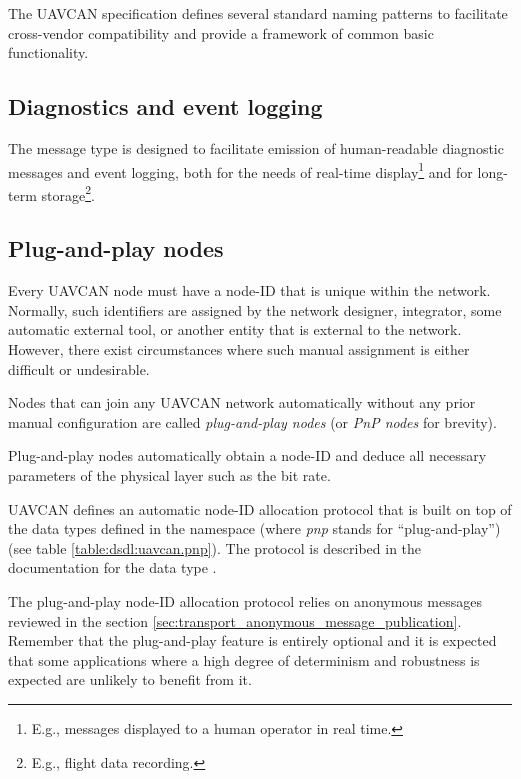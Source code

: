 The UAVCAN specification defines several standard naming patterns to facilitate cross-vendor compatibility
and provide a framework of common basic functionality.


\subsection{Diagnostics and event logging}

The message type  is designed to facilitate emission of
human-readable diagnostic messages and event logging,
both for the needs of real-time display\footnote{E.g., messages displayed to a human operator in real time.}
and for long-term storage\footnote{E.g., flight data recording.}.

\subsection{Plug-and-play nodes}

Every UAVCAN node must have a node-ID that is unique within the network.
Normally, such identifiers are assigned by the network designer, integrator, some automatic external tool,
or another entity that is external to the network.
However, there exist circumstances where such manual assignment is either difficult or undesirable.

Nodes that can join any UAVCAN network automatically without any prior manual configuration
are called \emph{plug-and-play nodes} (or \emph{PnP nodes} for brevity).

Plug-and-play nodes automatically obtain a node-ID and deduce all necessary parameters of the physical layer
such as the bit rate.

UAVCAN defines an automatic node-ID allocation protocol that is built on top of the data types defined in the
namespace  (where \emph{pnp} stands for ``plug-and-play'')
(see table \ref{table:dsdl:uavcan.pnp}).
The protocol is described in the documentation for the data type .

The plug-and-play node-ID allocation protocol relies on anonymous messages reviewed in the section
\ref{sec:transport_anonymous_message_publication}.
Remember that the plug-and-play feature is entirely optional and it is expected that some applications where a
high degree of determinism and robustness is expected are unlikely to benefit from it.

